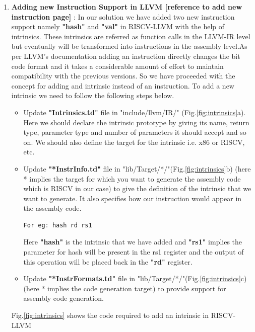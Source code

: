 \begin{enumerate}
    \item \textbf{Adding new Instruction Support in LLVM [reference to add new instruction page]} : In our solution we have added two new instruction support namely \textbf{"hash"} and \textbf{"val"} in RISCV-LLVM with the help of intrinsics. These intrinsics are referred as function calls in the LLVM-IR level but eventually will be transformed into instructions in the assembly level.As per LLVM's documentation adding an instruction directly changes the bit code format and it takes a considerable amount of effort to maintain compatibility with the previous versions. So we have proceeded with the concept for adding and intrinsic instead of an instruction. To add a new intrinsic we need to follow the following steps below.\\
    \begin{itemize}
        \item Update \textbf{"Intrinsics.td"} file in "include/llvm/IR/" (Fig.\ref{fig:intrinsics}a).  Here we should declare the intrinsic prototype by giving its name, return type, parameter type and number of parameters it should accept and so on. We should also define the target for the intrinsic i.e. x86 or RISCV, etc. \\
        
        \item Update \textbf{"*InstrInfo.td"} file in "lib/Target/*/"(Fig.\ref{fig:intrinsics}b) (here * implies the target for which you want to generate the assembly code which is RISCV in our case) to give the definition of the intrinsic that we want to generate. It also specifies how our instruction would appear in the assembly code.
        \begin{lstlisting}[language=C]
For eg: hash rd rs1
        \end{lstlisting}
        Here \textbf{"hash"} is the intrinsic that we have added and \textbf{"rs1"} implies the parameter for hash will be present in the rs1 register and the output of this operation will be placed back in the \textbf{"rd"} register.\\
        
        \item Update \textbf{"*InstrFormats.td"} file in "lib/Target/*/"(Fig.\ref{fig:intrinsics}c) (here * implies the code generation target) to provide support for assembly code generation. \\
        
    \end{itemize}
    Fig.\ref{fig:intrinsics} shows the code required to add an intrinsic in RISCV-LLVM\\
    

\end{enumerate}
